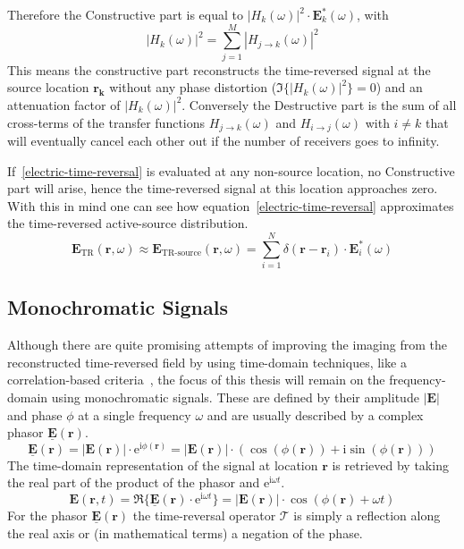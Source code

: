Therefore the Constructive part is equal to \(|H_k(\omega)|^2 \cdot \bm{E}^*_k(\omega)\), with
\begin{equation}
    |H_k(\omega)|^2 = \sum_{j=1}^{M} |H_{j\rightarrow k}(\omega)|^2
\end{equation}
This means the constructive part reconstructs the time-reversed signal at the source location \(\bm{r_k}\) without any phase distortion (\(\Im \{{|H_k(\omega)|^2}\} = 0\)) and an attenuation factor of \(|H_k(\omega)|^2\).
Conversely the Destructive part is the sum of all cross-terms of the transfer functions \(H_{j\rightarrow k}(\omega)\) and \(H_{i\rightarrow j}(\omega)\) with \(i \neq k\) that will eventually cancel each other out if the number of receivers goes to infinity.

If~\eqref{electric-time-reversal} is evaluated at any non-source location, no Constructive part will arise, hence the time-reversed signal at this location approaches zero.
With this in mind one can see how equation~\eqref{electric-time-reversal} approximates the time-reversed active-source distribution. 
\begin{equation}
    \bm{E}_{\text{TR}}(\bm{r}, \omega) \approx \bm{E}_{\text{TR-source}}(\bm{r}, \omega) =  \sum_{i=1}^{N} \delta(\bm{r}-\bm{r}_i) \cdot \bm{E}^*_i(\omega)
\end{equation}

\subsection{Monochromatic Signals}
Although there are quite promising attempts of improving the imaging from the reconstructed time-reversed field by using time-domain techniques, like a correlation-based criteria~\parencite{li_correlation-based_2021}, the focus of this thesis will remain on the frequency-domain using monochromatic signals.
These are defined by their amplitude \(|\bm{E}|\) and phase \(\phi \) at a single frequency \(\omega \) and are usually described by a complex phasor \(\underline{\bm{E}}(\bm{r})\).
\begin{equation}
    \underline{\bm{E}}(\bm{r}) = |\bm{E}(\bm{r})| \cdot \mathrm{e}^{\mathrm{i} \phi(\bm{r})} = |\bm{E}(\bm{r})| \cdot (\cos(\phi(\bm{r})) + \mathrm{i} \sin(\phi(\bm{r})))
\end{equation}
The time-domain representation of the signal at location \(\bm{r}\) is retrieved by taking the real part of the product of the phasor and \(\mathrm{e}^{\mathrm{i} \omega t}\).
\begin{equation}
    \bm{E}(\bm{r}, t) = \Re \{\underline{\bm{E}}(\bm{r}) \cdot \mathrm{e}^{\mathrm{i} \omega t}\} = |\bm{E}(\bm{r})| \cdot \cos(\phi(\bm{r}) + \omega t)
\end{equation}
For the phasor \(\underline{\bm{E}}(\bm{r})\) the time-reversal operator \(\mathcal{T}\) is simply a reflection along the real axis or (in mathematical terms) a negation of the phase.


